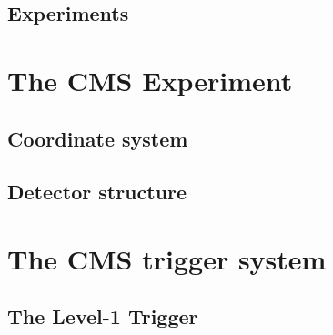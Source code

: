 
\subsection{Experiments}

\section{The CMS Experiment}
\subsection{Coordinate system}
\subsection{Detector structure}

\section{The CMS trigger system}
\subsection{The Level-1 Trigger}
